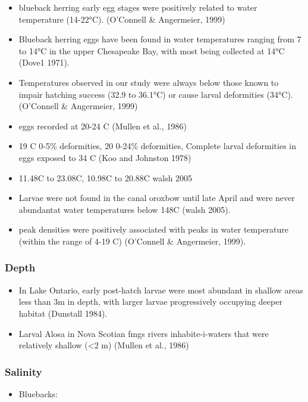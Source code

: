 \documentclass[
]{book}
\providecommand{\tightlist}{%
  \setlength{\itemsep}{0pt}\setlength{\parskip}{0pt}}
\begin{document}
\begin{itemize}
\tightlist
\item
  blueback herring early egg stages were positively related to water temperature (14-22°C). (O'Connell \& Angermeier, 1999)
\item
  Blueback herring eggs have been found in water temperatures ranging from 7 to 14°C in the upper Chesapeake Bay, with most being collected at 14°C (Dove1 1971).
\item
  Temperatures observed in our study were always below those known to impair hatching success (32.9 to 36.1°C) or cause larval deformities (34°C). (O'Connell \& Angermeier, 1999)
\item
  eggs recorded at 20-24 C (Mullen et al., 1986)
\item
  19 C 0-5\% deformities, 20 0-24\% deformities, Complete larval deformities in eggs exposed to 34 C (Koo and Johnston 1978)
\item
  11.48C to 23.08C, 10.98C to 20.88C walsh 2005
\item
  Larvae were not found in the canal oroxbow until late April and were never abundantat water temperatures below 148C (walsh 2005).
\item
  peak densities were positively associated with peaks in water temperature (within the range of 4-19 C) (O'Connell \& Angermeier, 1999).
\end{itemize}

\hypertarget{depth-8}{%
\subsubsection{Depth}\label{depth-8}}

\begin{itemize}
\tightlist
\item
  In Lake Ontario, early post-hatch larvae were most abundant in shallow areas less than 3m in depth, with larger larvae progressively occupying deeper habitat (Dunstall 1984).
\item
  Larval Alosa in Nova Scotian fmgs rivers inhabite-i-waters that were relatively shallow (\textless2 m) (Mullen et al., 1986)
\end{itemize}

\hypertarget{salinity-8}{%
\subsubsection{Salinity}\label{salinity-8}}

\begin{itemize}
\tightlist
\item
  Bluebacks:
\end{itemize}
\end{document}
